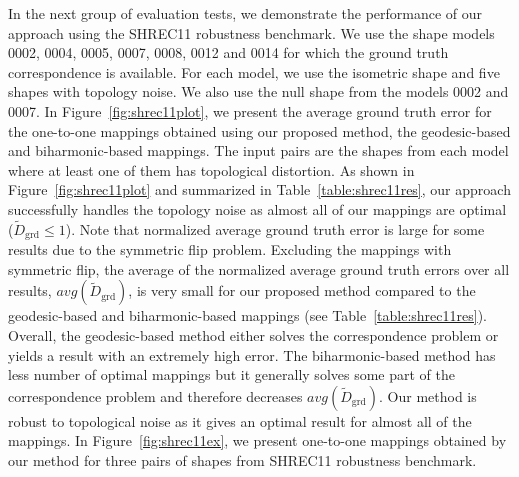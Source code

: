 In the next group of evaluation tests, we demonstrate the performance of our approach using the SHREC11 robustness benchmark. We use the shape models 0002, 0004, 0005, 0007, 0008, 0012 and 0014 for which the ground truth correspondence is available. For each model, we use the isometric shape and five shapes with topology noise. We also use the null shape from the models 0002 and 0007. In Figure~\ref{fig:shrec11plot}, we present the average ground truth error for the one-to-one mappings obtained using our proposed method, the geodesic-based and biharmonic-based mappings. The input pairs are the shapes from each model where at least one of them has topological distortion. As shown in Figure~\ref{fig:shrec11plot} and summarized in Table~\ref{table:shrec11res}, our approach successfully handles the topology noise as almost all of our mappings are optimal (${\widetilde{D}_{\mathrm{grd}}} \le 1$). Note that normalized average ground truth error is large for some results due to the symmetric flip problem. Excluding the mappings with symmetric flip, the average of the normalized average ground truth errors over all results, $avg({\widetilde{D}_{\mathrm{grd}}})$, is very small for our proposed method compared to the geodesic-based and biharmonic-based mappings (see Table~\ref{table:shrec11res}). Overall, the geodesic-based method either solves the correspondence problem or yields a result with an extremely high error. The biharmonic-based method has less number of optimal mappings but it generally solves some part of the correspondence problem and therefore decreases $avg({\widetilde{D}_{\mathrm{grd}}})$. Our method is robust to topological noise as it gives an optimal result for almost all of the mappings. In Figure~\ref{fig:shrec11ex}, we present one-to-one mappings obtained by our method for three pairs of shapes from SHREC11 robustness benchmark.

%

